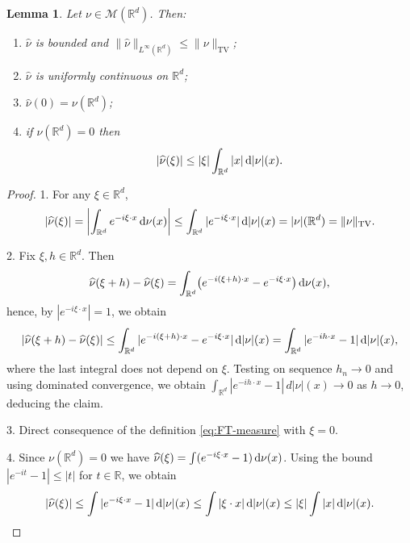 \documentclass[12pt,a4paper,oneside]{amsart}
\theoremstyle{plain}
\newtheorem{lemma}[theorem]{Lemma}
\theoremstyle{definition}
\numberwithin{equation}{section}
\numberwithin{figure}{section}
\numberwithin{table}{section}
\theoremstyle{remark}
\newcommand{\R}{\mathbb{R}}
\newcommand{\dd}{\textup{d}}
\newcommand{\calM}{\mathcal{M}}
\newcommand{\Fhat}[1]{\widehat{#1}}
\begin{document}
\begin{lemma}\label{l:FS-basic}
Let $\nu\in\calM(\R^d)$.
Then:
\begin{enumerate}[label=\arabic*.]
\item $\Fhat{\nu}$ is bounded and $\|\Fhat{\nu}\|_{L^\infty(\R^d)}\le \|\nu\|_{\mathrm{TV}}$;
\item $\Fhat{\nu}$ is uniformly continuous on $\R^d$;
\item $\Fhat{\nu}(0)=\nu(\R^d)$;
\item if $\nu(\R^d) = 0$ then
\begin{equation*}
    |\Fhat{\nu}(\xi)|\le |\xi|\int_{\R^d}|x|\,\dd|\nu|(x).
\end{equation*}
\end{enumerate}
\end{lemma}

\begin{proof}
1. For any $\xi\in\R^d$,
\begin{equation*}
|\Fhat{\nu}(\xi)|
=\left|\int_{\R^d} e^{-i\xi\cdot x}\,\dd\nu(x)\right|
\le \int_{\R^d} |e^{-i\xi\cdot x}|\,\dd|\nu|(x)
=|\nu|(\R^d)=\|\nu\|_{\mathrm{TV}}.    
\end{equation*}

2. Fix $\xi,h\in\R^d$. Then
\begin{equation*}
\Fhat{\nu}(\xi+h)-\Fhat{\nu}(\xi)
=\int_{\R^d} \bigl(e^{-i(\xi+h)\cdot x}-e^{-i\xi\cdot x}\bigr)\,\dd\nu(x),   \end{equation*}
hence, by $|e^{-i\xi \cdot x}|=1$, we obtain
\begin{equation*}
|\Fhat{\nu}(\xi+h)-\Fhat{\nu}(\xi)|
\le \int_{\R^d} |e^{-i(\xi+h)\cdot x}-e^{-i\xi\cdot x}|\,\dd|\nu|(x)=\int_{\R^d} |e^{-ih\cdot x}-1|\,\dd|\nu|(x),
\end{equation*}
where the last integral does not depend on $\xi$. Testing on sequence $h_n\to 0$ and using dominated convergence, we obtain $\int_{\R^d} |e^{-ih\cdot x}-1|\,d|\nu|(x)\to 0$ as $h\to 0$, deducing the claim.

 3. Direct consequence of the definition \eqref{eq:FT-measure} with $\xi=0$.

 4. Since $\nu(\R^d)=0$ we have $\Fhat{\nu}(\xi)=\int (e^{-i\xi\cdot x}-1)\,\dd\nu(x)$.
Using the bound $|e^{-it}-1|\le |t|$ for $t\in\R$, we obtain
\begin{equation*}
|\Fhat{\nu}(\xi)|
\le \int |e^{-i\xi\cdot x}-1|\,\dd|\nu|(x)
\le \int |\xi\cdot x|\,\dd|\nu|(x)
\le |\xi|\int |x|\,\dd|\nu|(x).    
\end{equation*}
\end{proof}
\end{document}
